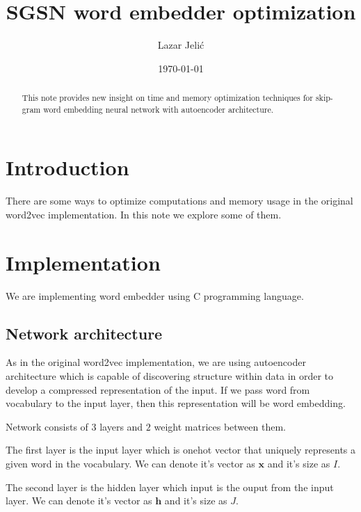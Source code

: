 \documentclass{article}
\title{SGSN word embedder optimization}
\author{Lazar Jelić}
\date{\today}
\begin{document}
\maketitle

\begin{abstract}

This note provides new insight on time and memory optimization techniques for
skip-gram word embedding neural network with autoencoder architecture.

\end{abstract}

\pagebreak

\section{Introduction}

There are some ways to optimize computations and memory usage in the
original word2vec implementation. In this note we explore some of them.

\pagebreak

\section{Implementation}

We are implementing word embedder using C programming language.

\subsection{Network architecture}

As in the original word2vec implementation, we are using autoencoder
architecture which is capable of discovering structure within data in order
to develop a compressed representation of the input. If we pass word from
vocabulary to the input layer, then this representation will be word embedding.

\medbreak

Network consists of $3$ layers and $2$ weight matrices between them.

The first layer is the input layer which is onehot vector that uniquely represents a given word in the vocabulary.
We can denote it's vector as $\boldsymbol{x}$ and it's size as $I$.

\medbreak

The second layer is the hidden layer which input is the ouput from the input
layer.
We can denote it's vector as $\boldsymbol{h}$ and it's size as $J$.
\end{document}
